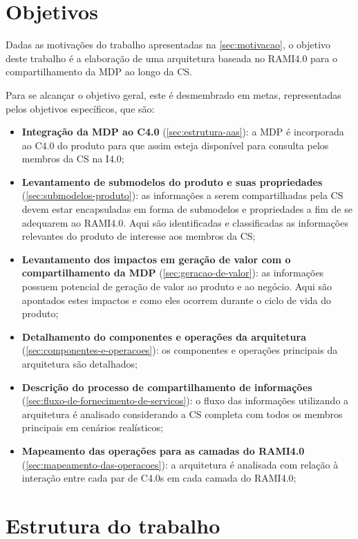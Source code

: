 \section{Objetivos}
\label{sec:objetivos}

Dadas as motivações do trabalho apresentadas na \autoref{sec:motivacao}, o objetivo deste trabalho é a elaboração de uma arquitetura baseada no RAMI4.0 para o compartilhamento da MDP ao longo da CS.

Para se alcançar o objetivo geral, este é desmembrado em metas, representadas pelos objetivos específicos, que são:

\begin{itemize}
	\item \textbf{Integração da MDP ao C4.0} (\autoref{sec:estrutura-aas}): a MDP é incorporada ao C4.0 do produto para que assim esteja disponível para consulta pelos membros da CS na I4.0;
	\item \textbf{Levantamento de submodelos do produto e suas propriedades} (\autoref{sec:submodelos-produto}): as informações a serem compartilhadas pela CS devem estar encapsuladas em forma de submodelos e propriedades a fim de se adequarem ao RAMI4.0. Aqui são identificadas e classificadas as informações relevantes do produto de interesse aos membros da CS;
	\item \textbf{Levantamento dos impactos em geração de valor com o compartilhamento da MDP} (\autoref{sec:geracao-de-valor}): as informações possuem potencial de geração de valor ao produto e ao negócio. Aqui são apontados estes impactos e como eles ocorrem durante o ciclo de vida do produto;
	\item \textbf{Detalhamento do componentes e operações da arquitetura} (\autoref{sec:componentes-e-operacoes}): os componentes e operações principais da arquitetura são detalhados;
	\item \textbf{Descrição do processo de compartilhamento de informações} (\autoref{sec:fluxo-de-fornecimento-de-servicos}): o fluxo das informações utilizando a arquitetura é analisado considerando a CS completa com todos os membros principais em cenários realísticos;
	\item \textbf{Mapeamento das operações para as camadas do RAMI4.0} (\autoref{sec:mapeamento-das-operacoes}): a arquitetura é analisada com relação à interação entre cada par de C4.0s em cada camada do RAMI4.0;
\end{itemize}

\section{Estrutura do trabalho}
\label{sec:estrutura}

